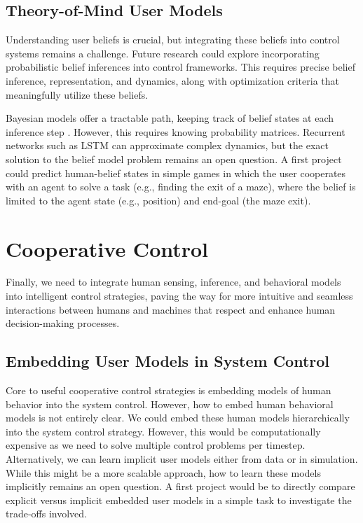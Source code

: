 \subsection{Theory-of-Mind User Models}
Understanding user beliefs is crucial, but integrating these beliefs into control systems remains a challenge. Future research could explore incorporating probabilistic belief inferences into control frameworks. This requires precise belief inference, representation, and dynamics, along with optimization criteria that meaningfully utilize these beliefs.

Bayesian models offer a tractable path, keeping track of belief states at each inference step \cite{baker2011bayesian}. However, this requires knowing probability matrices. Recurrent networks such as LSTM can approximate complex dynamics, but the exact solution to the belief model problem remains an open question. A first project could predict human-belief states in simple games in which the user cooperates with an agent to solve a task (e.g., finding the exit of a maze), where the belief is limited to the agent state (e.g., position) and end-goal (the maze exit).

\section{Cooperative Control}
Finally, we need to integrate human sensing, inference, and behavioral models into intelligent control strategies, paving the way for more intuitive and seamless interactions between humans and machines that respect and enhance human decision-making processes.

\subsection{Embedding User Models in System Control}
Core to useful cooperative control strategies is embedding models of human behavior into the system control. However, how to embed human behavioral models is not entirely clear. We could embed these human models hierarchically into the system control strategy. However, this would be computationally expensive as we need to solve multiple control problems per timestep. Alternatively, we can learn implicit user models either from data or in simulation. While this might be a more scalable approach, how to learn these models implicitly remains an open question. A first project would be to directly compare explicit versus implicit embedded user models in a simple task to investigate the trade-offs involved.

